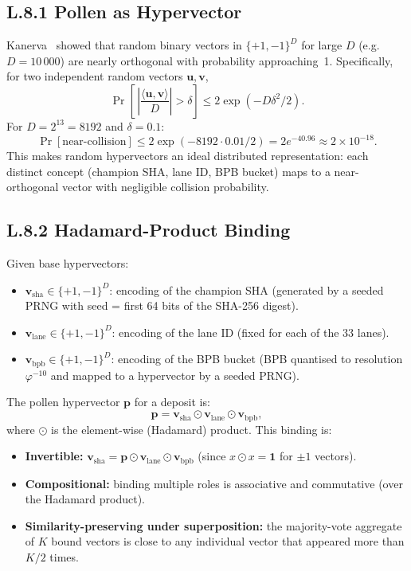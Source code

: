 \subsection*{L.8.1 \quad Pollen as Hypervector}

Kanerva~\cite{kanerva_hyperdimensional} showed that random
binary vectors in $\{+1,-1\}^{D}$ for large $D$ (e.g.\ $D = 10\,000$)
are nearly orthogonal with probability approaching~1.  Specifically,
for two independent random vectors $\mathbf{u}, \mathbf{v}$,
\[
  \Pr\!\left[\,\left|\frac{\langle \mathbf{u}, \mathbf{v}\rangle}{D}\right| > \delta\right]
  \leq 2\exp(-D\delta^{2}/2).
\]
For $D = 2^{13} = 8192$ and $\delta = 0.1$:
\[
  \Pr[\text{near-collision}] \leq 2\exp(-8192 \cdot 0.01/2) = 2e^{-40.96} \approx 2 \times 10^{-18}.
\]
This makes random hypervectors an ideal distributed representation:
each distinct concept (champion SHA, lane ID, BPB bucket) maps to a
near-orthogonal vector with negligible collision probability.

\subsection*{L.8.2 \quad Hadamard-Product Binding}

Given base hypervectors:
\begin{itemize}
\item $\mathbf{v}_{\text{sha}} \in \{+1,-1\}^{D}$: encoding of the
  champion SHA (generated by a seeded PRNG with seed = first 64 bits
  of the SHA-256 digest).
\item $\mathbf{v}_{\text{lane}} \in \{+1,-1\}^{D}$: encoding of the
  lane ID (fixed for each of the 33 lanes).
\item $\mathbf{v}_{\text{bpb}} \in \{+1,-1\}^{D}$: encoding of the BPB
  bucket (BPB quantised to resolution $\varphi^{-10}$ and mapped to a
  hypervector by a seeded PRNG).
\end{itemize}

The pollen hypervector $\mathbf{p}$ for a deposit is:
\begin{equation}
  \mathbf{p} = \mathbf{v}_{\text{sha}} \odot \mathbf{v}_{\text{lane}} \odot \mathbf{v}_{\text{bpb}},
  \label{eq:hadamard}
\end{equation}
where $\odot$ is the element-wise (Hadamard) product.  This binding
is:
\begin{itemize}
\item \textbf{Invertible:} $\mathbf{v}_{\text{sha}} = \mathbf{p} \odot
  \mathbf{v}_{\text{lane}} \odot \mathbf{v}_{\text{bpb}}$ (since
  $x \odot x = \mathbf{1}$ for $\pm 1$ vectors).
\item \textbf{Compositional:} binding multiple roles is associative
  and commutative (over the Hadamard product).
\item \textbf{Similarity-preserving under superposition:} the
  majority-vote aggregate of $K$ bound vectors is close to any
  individual vector that appeared more than $K/2$ times.
\end{itemize}

